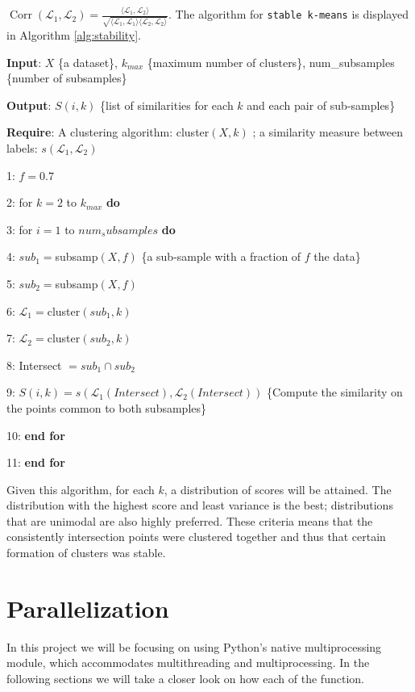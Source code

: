 \documentclass[10pt,twocolumn,letterpaper]{article}
\DeclareMathOperator{\Corr}{Corr}
\begin{document}
$
\Corr(\mathcal{L}_1, \mathcal{L}_2) = \frac{\langle \mathcal{L}_1, \mathcal{L}_2 \rangle}{\sqrt{\langle \mathcal{L}_1,\mathcal{L}_1\rangle \langle \mathcal{L}_2,\mathcal{L}_2\rangle}}.
$ The algorithm for \texttt{stable k-means} is displayed in Algorithm \ref{alg:stability}.

\begin{algorithm}[H] 
\textbf{Input}: $X$ \{a dataset\}, $k_{max}$ \{maximum number of
clusters\}, num\_subsamples \{number of subsamples\} 

\textbf{Output}: $S(i,k)$ \{list of similarities for each $k$ and
each pair of sub-samples\}

\textbf{Require}: A clustering algorithm: cluster$(X,k)$ ; a similarity
measure between labels: $s(\mathcal{L}_1,\mathcal{L}_2)$

1: $f = 0.7$ 

2: for $k=2$ to $k_{max}$ \textbf{do} 

3: for $i=1$ to $num_subsamples$ \textbf{do} 

4: $sub_1 = $subsamp$(X, f)$ \{a sub-sample with a fraction of $f$
the data\} 

5: $sub_2 = $subsamp$(X, f)$ 

6: $\mathcal{L}_1=$cluster$(sub_1, k)$ 

7: $\mathcal{L}_2=$cluster$(sub_2, k)$ 

8: Intersect $= sub_1 \cap sub_2$

9: $S(i, k) = s(\mathcal{L}_1(Intersect), \mathcal{L}_2(Intersect))$
\{Compute the similarity on the points common to both subsamples\} 

10: \textbf{end for }

11: \textbf{end for}

\caption{\label{alg:stability}}
\end{algorithm}

Given this algorithm, for each $k$, a distribution of scores will be attained. The distribution with the highest score and least variance is the best; distributions that are unimodal are also highly preferred. These criteria means that the consistently intersection points were clustered together and thus that certain formation of clusters was stable. 

\section{Parallelization} \label{parallel}

In this project we will be focusing on using Python's native multiprocessing module, which accommodates multithreading and multiprocessing. In the following sections we will take a closer look on how each of the function.
\end{document}
